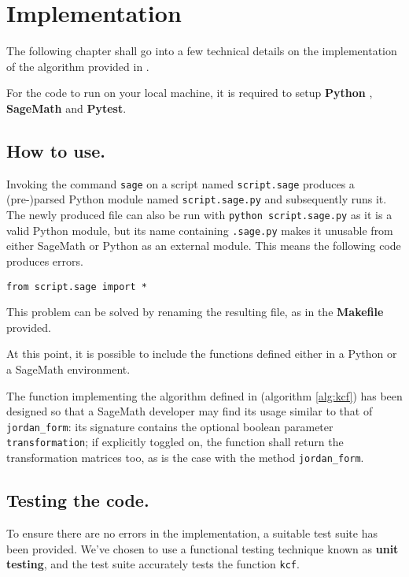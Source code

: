 \section{Implementation}
The following chapter shall go into a few technical details on the implementation of the algorithm provided in
\cite{Trapani_Computation_of_Kronecker_s}.

For the code to run on your local machine, it is required to setup \textbf{Python} \cite{van1995python},
\textbf{SageMath} and \textbf{Pytest}.

\subsection*{How to use.}
Invoking the command \texttt{sage} on a script named \texttt{script.sage} produces a (pre-)parsed
Python module named \texttt{script.sage.py} and subsequently runs it. The newly produced file can also
be run with \texttt{python script.sage.py} as it is a valid Python module, but its name containing
\texttt{.sage.py} makes it unusable from either SageMath or Python as an external module. This means the
following code produces errors.
\begin{verbatim}
from script.sage import *
\end{verbatim}

This problem can be solved by renaming the resulting file, as in the \textbf{Makefile} provided.

At this point, it is possible to include the functions defined either in a Python or a SageMath environment.

The function implementing the algorithm defined in  (algorithm \ref{alg:kcf}) has been designed
so that a SageMath developer may find its usage similar to that of \texttt{jordan_form}: its signature
contains the optional boolean parameter \texttt{transformation}; if explicitly toggled on, the function
shall return the transformation matrices too, as is the case with the method \texttt{jordan_form}.

\subsection*{Testing the code.}
To ensure there are no errors in the implementation, a suitable
test suite has been provided. We've chosen to use a functional testing technique known as \textbf{unit testing},
and the test suite accurately tests the function \texttt{kcf}.

